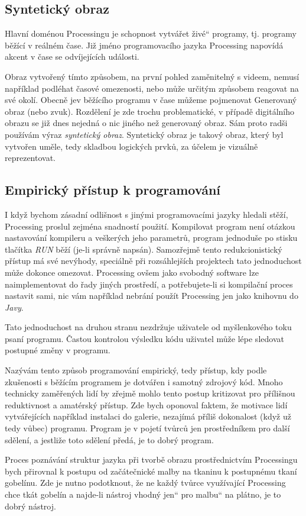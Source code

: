 \documentclass[10pt]{book}
\renewcommand\uv[1]{\quotedblbase #1\textquotedblleft}%
\newcommand{\pododdil}[1]{\subsection{#1}\index{#1}\label{#1}}
\begin{document}
\pododdil{Syntetický obraz}

Hlavní doménou Processingu je schopnost vytvářet \uv{živé} programy, tj. programy běžící v reálném čase. Již jméno programovacího jazyka Processing napovídá akcent v čase se odvíjejících události.

Obraz vytvořený tímto způsobem, na první pohled zaměnitelný s videem, nemusí například podléhat časové omezenosti, nebo může určitým způsobem reagovat na své okolí. Obecně jev běžícího programu v čase můžeme pojmenovat Generovaný obraz (nebo zvuk). Rozdělení je zde trochu problematické, v případě digitálního obrazu se již dnes nejedná o nic jiného než generovaný obraz. Sám proto radši používám výraz {\em syntetický obraz}. Syntetický obraz je takový obraz, který byl vytvořen uměle, tedy skladbou logických prvků, za účelem je vizuálně reprezentovat. 


\pododdil{Empirický přístup k programování}

	I když bychom zásadní odlišnost s jinými programovacími jazyky hledali stěží, Processing proslul zejména snadností použití. Kompilovat program není otázkou nastavování kompileru a veškerých jeho parametrů, program jednoduše po stisku tlačítka {\em RUN} běží (je-li správně napsán). Samozřejmě tento redukcionistický přístup má své nevýhody, speciálně při rozsáhlejších projektech tato jednoduchost může dokonce omezovat. Processing ovšem jako svobodný software lze naimplementovat do řady jiných prostředí, a potřebujete-li si kompilační proces nastavit sami, nic vám například nebrání použít Processing jen jako knihovnu do {\em Javy}.

Tato jednoduchost na druhou stranu nezdržuje uživatele od myšlenkového toku psaní programu. Častou kontrolou výsledku kódu uživatel může lépe sledovat postupné změny v programu.

Nazývám tento způsob programování empirický, tedy přístup, kdy podle zkušenosti s běžícím programem je dotvářen i samotný zdrojový kód. Mnoho technicky zaměřených lidí by zřejmě mohlo tento postup kritizovat pro přílišnou reduktivnost a amatérský přístup. Zde bych oponoval faktem, že motivace lidí vytvářejících například instalaci do galerie, nezajímá příliš dokonalost (když už tedy vůbec) programu. Program je v pojetí tvůrců jen prostředníkem pro další sdělení, a jestliže toto sdělení předá, je to dobrý program.

Proces poznávání struktur jazyka při tvorbě obrazu prostřednictvím Processingu bych přirovnal k postupu od začátečnické malby na tkaninu k postupnému tkaní gobelínu. Zde je nutno podotknout, že ne každý tvůrce využívající Processing chce tkát gobelín a najde-li nástroj vhodný \uv{jen} pro \uv{malbu} na plátno, je to dobrý nástroj.
\end{document}
